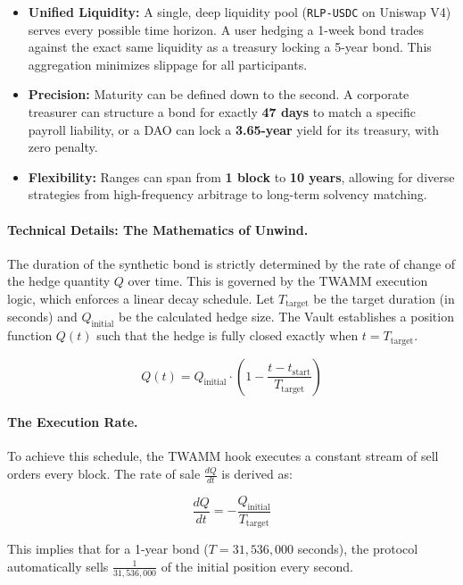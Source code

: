 \documentclass[12pt]{article}
\begin{document}
\begin{itemize}
    \item \textbf{Unified Liquidity:} A single, deep liquidity pool (\texttt{RLP-USDC} on Uniswap V4) serves every possible time horizon. A user hedging a 1-week bond trades against the exact same liquidity as a treasury locking a 5-year bond. This aggregation minimizes slippage for all participants.
    \item \textbf{Precision:} Maturity can be defined down to the second. A corporate treasurer can structure a bond for exactly \textbf{47 days} to match a specific payroll liability, or a DAO can lock a \textbf{3.65-year} yield for its treasury, with zero penalty.
    \item \textbf{Flexibility:} Ranges can span from \textbf{1 block} to \textbf{10 years}, allowing for diverse strategies from high-frequency arbitrage to long-term solvency matching.
\end{itemize}

\paragraph{Technical Details: The Mathematics of Unwind.}
The duration of the synthetic bond is strictly determined by the rate of change of the hedge quantity $Q$ over time. This is governed by the TWAMM execution logic, which enforces a linear decay schedule. Let $T_{\text{target}}$ be the target duration (in seconds) and $Q_{\text{initial}}$ be the calculated hedge size. The Vault establishes a position function $Q(t)$ such that the hedge is fully closed exactly when $t = T_{\text{target}}$.

\begin{equation}
    Q(t) = Q_{\text{initial}} \cdot \left( 1 - \frac{t - t_{\text{start}}}{T_{\text{target}}} \right)
\end{equation}

\paragraph{The Execution Rate.}
To achieve this schedule, the TWAMM hook executes a constant stream of sell orders every block. The rate of sale $\frac{dQ}{dt}$ is derived as:

\begin{equation}
    \frac{dQ}{dt} = - \frac{Q_{\text{initial}}}{T_{\text{target}}}
\end{equation}

This implies that for a 1-year bond ($T = 31{,}536{,}000$ seconds), the protocol automatically sells $\frac{1}{31{,}536{,}000}$ of the initial position every second.
\end{document}
